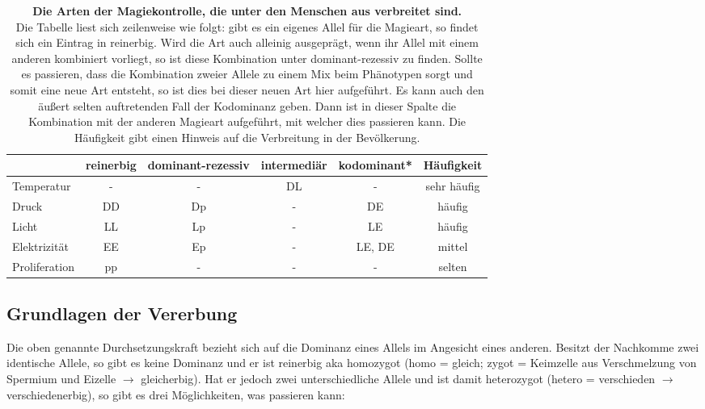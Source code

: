 \begin{table}[hbtp]
	\centering
	\caption[Verbreitete Magiearten in ]%
	{\textbf{Die Arten der Magiekontrolle, die unter den Menschen aus  verbreitet sind. } \\
		Die Tabelle liest sich zeilenweise wie folgt: gibt es ein eigenes Allel für die Magieart, so findet sich ein Eintrag in reinerbig.
		Wird die Art auch alleinig ausgeprägt, wenn ihr Allel mit einem anderen kombiniert vorliegt, so ist diese Kombination unter dominant-rezessiv zu finden.
		Sollte es passieren, dass die Kombination zweier Allele zu einem Mix beim Phänotypen sorgt und somit eine neue Art entsteht, so ist dies bei dieser neuen Art hier aufgeführt.
		Es kann auch den äußert selten auftretenden Fall der Kodominanz geben.
		Dann ist in dieser Spalte die Kombination mit der anderen Magieart aufgeführt, mit welcher dies passieren kann.
		Die Häufigkeit gibt einen Hinweis auf die Verbreitung in der Bevölkerung.
		} 
	\label{tab:landmagie}
	\begin{threeparttable}
		\begin{tabularx}{\textwidth}{l|cccc|c}
			\toprule
			              & reinerbig & dominant-rezessiv & intermediär & kodominant* & Häufigkeit  \\ \midrule
			 Temperatur   &     -      &         -         &     DL      &      -      & sehr häufig \\
			    Druck     & DD        &        Dp         &      -      &     DE      &   häufig    \\
			    Licht     & LL        &        Lp         &      -      &     LE      &   häufig    \\
			Elektrizität  & EE        &        Ep         &      -      &   LE, DE    & mittel \\
			Proliferation & pp        &         -          &      -      &      -      &   selten    \\ \bottomrule
		\end{tabularx}
	\end{threeparttable} 
\end{table}



\subsection{Grundlagen der Vererbung}
Die oben genannte Durchsetzungskraft bezieht sich auf die Dominanz eines Allels im Angesicht eines anderen. 
Besitzt der Nachkomme zwei identische Allele, so gibt es keine Dominanz und er ist reinerbig aka homozygot (homo = gleich; zygot = Keimzelle aus Verschmelzung von Spermium und Eizelle $\rightarrow$ gleicherbig).
Hat er jedoch zwei unterschiedliche Allele und ist damit heterozygot (hetero = verschieden $\rightarrow$ verschiedenerbig), so gibt es drei Möglichkeiten, was passieren kann:

